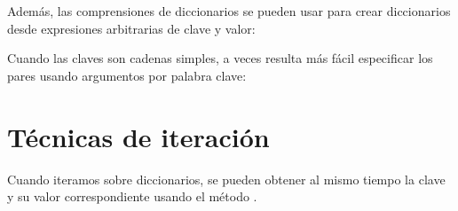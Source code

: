 \documentclass[a4,10pt,spanish]{sphinxmanual}
\begin{document}
\sphinxAtStartPar
Además, las comprensiones de diccionarios se pueden usar para crear diccionarios desde expresiones arbitrarias de clave y valor:

\begin{sphinxVerbatim}[commandchars=\\\{\}]
       
\end{sphinxVerbatim}

\sphinxAtStartPar
Cuando las claves son cadenas simples, a veces resulta más fácil especificar los pares usando argumentos por palabra clave:

\begin{sphinxVerbatim}[commandchars=\\\{\}]
  
\end{sphinxVerbatim}


\section{Técnicas de iteración}
\label{\detokenize{tutorial/datastructures:looping-techniques}}\label{\detokenize{tutorial/datastructures:tut-loopidioms}}
\sphinxAtStartPar
Cuando iteramos sobre diccionarios, se pueden obtener al mismo tiempo la clave y su valor correspondiente usando el método .

\begin{sphinxVerbatim}[commandchars=\\\{\}]
     
    
     
\end{sphinxVerbatim}
\end{document}
